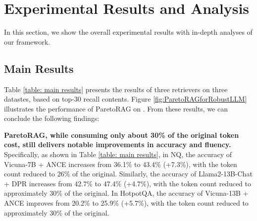 \section{Experimental Results and Analysis}
In this section, we show the overall experimental results with in-depth analyses of our framework.

\subsection{Main Results}

Table \ref{table: main results} presents the results of three retrievers on three datastes, based on top-30 recall contents. Figure \ref{fig:ParetoRAGforRobustLLM} illustrates the performance of ParetoRAG on . From these results, we can conclude the following findings:

\textbf{ParetoRAG, while consuming only about 30\% of the original token cost, still delivers  notable  improvements in accuracy and fluency.} Specifically,  as shown in Table \ref{table: main results}, in NQ, the accuracy of Vicuna-7B + ANCE increases from 36.1\% to 43.4\% (+7.3\%), with the token count reduced to 26\% of the original. Similarly, the accuracy of Llama2-13B-Chat + DPR increases from 42.7\% to 47.4\% (+4.7\%), with the token count reduced to approximately 30\% of the original. In HotpotQA, the accuracy of Vicuna-13B + ANCE improves from 20.2\% to 25.9\% (+5.7\%), with the token count reduced to approximately 30\% of the original. 

